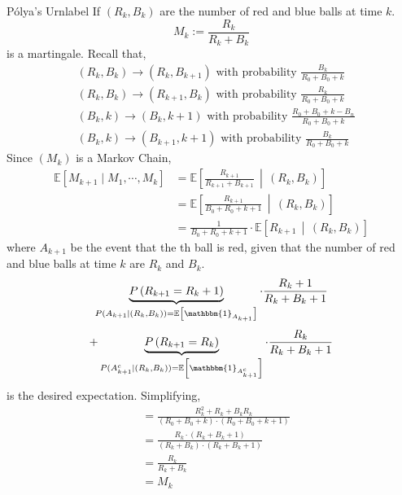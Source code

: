 \documentclass{tufte-handout}
\begin{document}
\begin{ex}{P\'{o}lya's Urn}{label}
  If $(R_k, B_k)$ are the number of red and blue balls at time $k$.
  \[M_k := \frac{R_k}{R_k + B_k}\]
  \noindent is a martingale. Recall that,
  \begin{align*}
    &(R_k, B_k) \rightarrow (R_k, B_{k+1}) \text{ with probability } \frac{B_k}{R_0 + B_0 + k} \\
    &(R_k, B_k) \rightarrow (R_{k+1}, B_{k}) \text{ with probability } \frac{R_k}{R_0 + B_0 + k} \\
    &(B_k, k) \rightarrow (B_k, k+1) \text{ with probability } \frac{R_0 + B_0 + k - B_n}{R_0 + B_0 + k} \\
    &(B_k, k) \rightarrow (B_{k+1}, k+1) \text{ with probability } \frac{B_k}{R_0 + B_0 + k}
  \end{align*}
  Since $(M_k)$ is a Markov Chain,
  \begin{align*}
    \mathbb{E}[M_{k+1} \mid M_1, \cdots, M_k]
    &= \mathbb{E}\left[\frac{R_{k+1}}{R_{k+1} + B_{k+1}} \,\middle\vert\, (R_k, B_k) \right] \\
    &= \mathbb{E}\left[\frac{R_{k+1}}{B_0 + R_0 + k + 1} \,\middle\vert\, (R_k, B_k) \right] \\
    &= \frac{1}{B_0 + R_0 + k + 1} \cdot \mathbb{E}\left[R_{k+1} \,\middle\vert\, (R_k, B_k) \right]
  \end{align*}
  where $A_{k+1}$ be the event that the th ball is red, given that the number of red and blue balls at time $k$ are $R_k$ and $B_k$.
  \[\underbrace{P\left(R_{k+1}=R_{k}+1\right)}_{P(A_{k+1} \mid (R_k, B_k)) = \mathbb{E}\left[\mathbbm{1}_{A_{k+1}}\right]} \cdot \frac{R_{k}+1}{R_{k}+B_{k}+1}\]
  \[+\underbrace{P\left(R_{k+1}=R_{k}\right)}_{P(A^c_{k+1}\mid (R_k, B_k))=\mathbb{E}\left[\mathbbm{1}_{A^c_{k+1}}\right]} \cdot \frac{R_{k}}{R_{k}+B_{k}+1}\]
  \noindent is the desired expectation. Simplifying,
  \begin{align*}
    &=\frac{R_{k}^{2}+R_{k}+B_{k} R_{k}}{\left(R_{0}+B_{0}+k\right) \cdot \left(R_{0}+B_{0}+k+1\right)} \\
    &=\frac{R_{k} \cdot \left(R_{k}+B_{k}+1\right)}{\left(R_{k}+B_{k}\right) \cdot \left(R_{k}+B_{k}+1\right)} \\
    &=\frac{R_{k}}{R_{k}+B_{k}} \\
    &=M_k
  \end{align*}
\end{ex}
\end{document}
